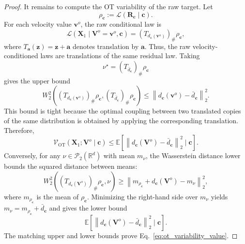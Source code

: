 \documentclass{article} %
\begin{document}
\begin{proof}
It remains to compute the OT variability of the raw target. Let
\[
    \rho_{\mathbf c}
    :=
    \mathcal L(\mathbf R_{\mathbf c}\mid\mathbf c).
\]
For each velocity value $\mathbf v^{o}$, the raw conditional law is
\[
    \mathcal L
    (
        \mathbf X_1
        \mid
        \mathbf V^{o}=\mathbf v^{o},
        \mathbf c
    )
    =
    (T_{d_{\mathbf c}(\mathbf v^{o})})_{\#}\rho_{\mathbf c},
\]
where $T_{\mathbf a}(\mathbf z)=\mathbf z+\mathbf a$ denotes translation by
$\mathbf a$. Thus, the raw velocity-conditioned laws are translations of the
same residual law. Taking
\[
    \nu^\star
    =
    (T_{\bar d_{\mathbf c}})_{\#}\rho_{\mathbf c}
\]
gives the upper bound
\[
    W_2^2
    \left(
        (T_{d_{\mathbf c}(\mathbf v^{o})})_{\#}\rho_{\mathbf c},
        (T_{\bar d_{\mathbf c}})_{\#}\rho_{\mathbf c}
    \right)
    \le
    \left\|
        d_{\mathbf c}(\mathbf v^{o})
        -
        \bar d_{\mathbf c}
    \right\|_2^2.
\]
This bound is tight because the optimal coupling between two translated copies
of the same distribution is obtained by applying the corresponding translation.
Therefore,
\[
    \mathcal V_{\mathrm{OT}}
    (
        \mathbf X_1;
        \mathbf V^{o}
        \mid
        \mathbf c
    )
    \le
    \mathbb E
    \left[
        \left\|
            d_{\mathbf c}(\mathbf V^{o})
            -
            \bar d_{\mathbf c}
        \right\|_2^2
        \mid
        \mathbf c
    \right].
\]
Conversely, for any $\nu\in\mathcal P_2(\mathbb R^d)$ with mean
$m_{\nu}$, the Wasserstein distance lower bounds the squared distance between
means:
\[
    W_2^2
    \left(
        (T_{d_{\mathbf c}(\mathbf V^{o})})_{\#}\rho_{\mathbf c},
        \nu
    \right)
    \ge
    \left\|
        m_{\rho_{\mathbf c}}
        +
        d_{\mathbf c}(\mathbf V^{o})
        -
        m_{\nu}
    \right\|_2^2,
\]
where $m_{\rho_{\mathbf c}}$ is the mean of $\rho_{\mathbf c}$. Minimizing the
right-hand side over $m_{\nu}$ yields
$m_{\nu}=m_{\rho_{\mathbf c}}+\bar d_{\mathbf c}$ and gives the lower bound
\[
    \mathbb E
    \left[
        \left\|
            d_{\mathbf c}(\mathbf V^{o})
            -
            \bar d_{\mathbf c}
        \right\|_2^2
        \mid
        \mathbf c
    \right].
\]
The matching upper and lower bounds prove
Eq.~\eqref{eq:ot_variability_value}.


\end{proof}
\end{document}

